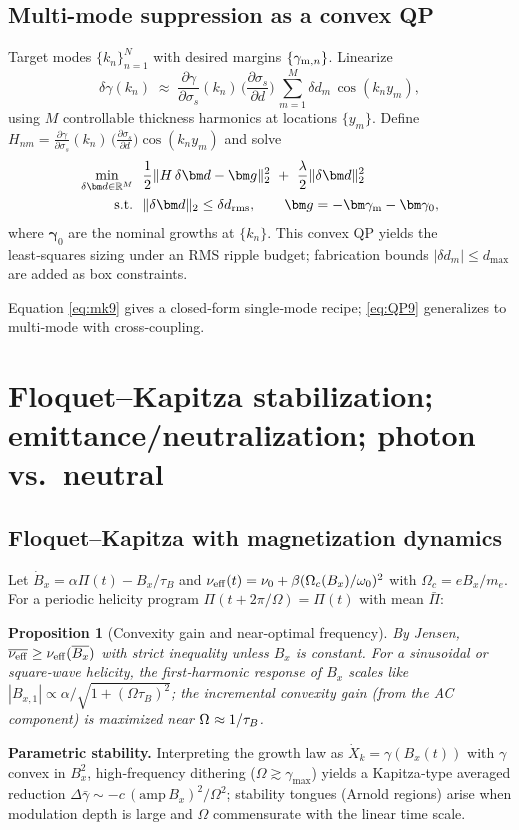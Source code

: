\documentclass[aps,pre,twocolumn,showpacs,superscriptaddress]{revtex4-2}
\newtheorem{proposition}[theorem]{Proposition}
\theoremstyle{definition}
\newcommand{\RR}{\mathbb{R}}
\begin{document}
\subsection{Multi-mode suppression as a convex QP}\label{subsec:QP9}

Target modes $\{k_n\}_{n=1}^N$ with desired margins $\{\gamma_{{\rm m},n}\}$. Linearize
\[
\delta\gamma(k_n)\;\approx\; \frac{\partial \gamma}{\partial \sigma_s}(k_n)\,\Big(\frac{\partial\sigma_s}{\partial d}\Big)\,\sum_{m=1}^M \delta d_m\,\cos(k_n y_m),
\]
using $M$ controllable thickness harmonics at locations $\{y_m\}$. Define $H_{nm}=\frac{\partial \gamma}{\partial \sigma_s}(k_n)\,\big(\frac{\partial\sigma_s}{\partial d}\big)\cos(k_n y_m)$ and solve
\begin{align}
\min_{\delta \bm d\in\RR^M}\ &\ \frac{1}{2}\|H\,\delta\bm d - \bm g\|_2^2 \ +\ \frac{\lambda}{2}\|\delta\bm d\|_2^2 \label{eq:QP9}\\
\text{s.t.}\ &\ \|\delta\bm d\|_2 \le \delta d_{\rm rms},\qquad \bm g = -\bm\gamma_{\rm m} - \bm\gamma_0,\nonumber
\end{align}
where $\bm\gamma_0$ are the nominal growths at $\{k_n\}$. This convex QP yields the least‑squares sizing under an RMS ripple budget; fabrication bounds $|\delta d_m|\le d_{\max}$ are added as box constraints.

\medskip
Equation \eqref{eq:mk9} gives a closed‑form single‑mode recipe; \eqref{eq:QP9} generalizes to multi‑mode with cross‑coupling.

\section{Floquet--Kapitza stabilization; emittance/neutralization; photon vs.\ neutral}\label{sec:brief-10-12}

\subsection{Floquet--Kapitza with magnetization dynamics}\label{subsec:floquet10}

Let $\dot B_x=\alpha \Pi(t)-B_x/\tau_B$ and $\nu_{\rm eff}(t)=\nu_0+\beta(\Omega_c(B_x)/\omega_0)^2$ with $\Omega_c=eB_x/m_e$. For a periodic helicity program $\Pi(t+2\pi/\Omega)=\Pi(t)$ with mean $\bar\Pi$:
\begin{proposition}[Convexity gain and near‑optimal frequency]\label{prop:floquet10}
By Jensen, $\overline{\nu_{\rm eff}}\ge \nu_{\rm eff}(\overline{B_x})$ with strict inequality unless $B_x$ is constant. For a sinusoidal or square‑wave helicity, the first‑harmonic response of $B_x$ scales like $|B_{x,1}|\propto \alpha/ \sqrt{1+(\Omega \tau_B)^2}$; the \emph{incremental} convexity gain (from the AC component) is maximized near $\Omega^{\*}\approx 1/\tau_B$. 
\end{proposition}
\noindent\textbf{Parametric stability.} Interpreting the growth law as $\dot X_k=\gamma(B_x(t))$ with $\gamma$ convex in $B_x^2$, high‑frequency dithering ($\Omega\gtrsim \gamma_{\max}$) yields a Kapitza‑type averaged reduction $\Delta\bar\gamma \sim -c\,(\mathrm{amp}\,B_x)^2/\Omega^2$; stability tongues (Arnold regions) arise when modulation depth is large and $\Omega$ commensurate with the linear time scale.
\end{document}
